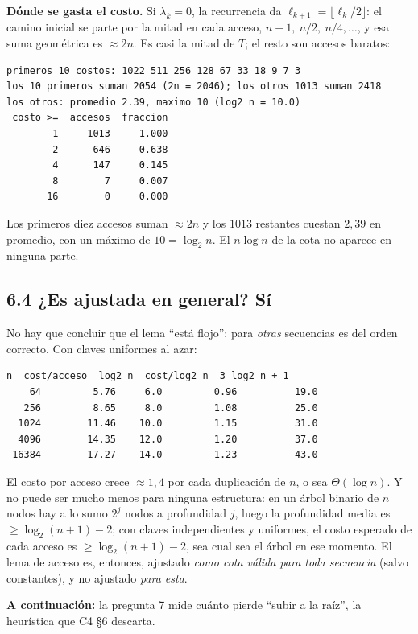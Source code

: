 \documentclass[11pt]{article}
\begin{document}
\textbf{Dónde se gasta el costo.} Si $\lambda_k=0$, la recurrencia da $\ell_{k+1}=\lfloor\ell_k/2\rfloor$: el camino inicial se parte por la mitad en cada acceso, $n-1,\ n/2,\ n/4,\dots$, y
esa suma geométrica es $\approx2n$. Es casi la mitad de $T$; el resto son accesos baratos:
\begin{lstlisting}[style=salida,basicstyle=\ttfamily\footnotesize\color{black},columns=fixed]
primeros 10 costos: 1022 511 256 128 67 33 18 9 7 3
los 10 primeros suman 2054 (2n = 2046); los otros 1013 suman 2418
los otros: promedio 2.39, maximo 10 (log2 n = 10.0)
 costo >=  accesos  fraccion
        1     1013     1.000
        2      646     0.638
        4      147     0.145
        8        7     0.007
       16        0     0.000
\end{lstlisting}
Los primeros diez accesos suman $\approx2n$ y los $1013$ restantes cuestan $2{,}39$ en promedio, con un máximo de $10=\log_2n$. El $n\log n$ de la cota no aparece en ninguna parte.

\subsection*{6.4 ¿Es ajustada en general? Sí}

No hay que concluir que el lema ``está flojo'': para \emph{otras} secuencias es del orden correcto. Con claves uniformes al azar:
\begin{lstlisting}[style=salida,basicstyle=\ttfamily\footnotesize\color{black},columns=fixed]
     n  cost/acceso  log2 n  cost/log2 n  3 log2 n + 1
    64         5.76     6.0         0.96          19.0
   256         8.65     8.0         1.08          25.0
  1024        11.46    10.0         1.15          31.0
  4096        14.35    12.0         1.20          37.0
 16384        17.27    14.0         1.23          43.0
\end{lstlisting}
El costo por acceso crece $\approx1{,}4$ por cada duplicación de $n$, o sea $\Theta(\log n)$. Y no puede ser mucho menos para ninguna estructura: en un árbol binario de $n$ nodos hay a lo sumo $2^j$ nodos a profundidad $j$,
luego la profundidad media es $\ge\log_2(n+1)-2$; con claves independientes y uniformes, el costo esperado de cada acceso es $\ge\log_2(n+1)-2$, sea cual sea el árbol en ese momento. El lema de acceso es, entonces,
ajustado \emph{como cota válida para toda secuencia} (salvo constantes), y no ajustado \emph{para esta}.

\textbf{A continuación:} la pregunta 7 mide cuánto pierde ``subir a la raíz'', la heurística que C4 §6 descarta.
\end{document}
